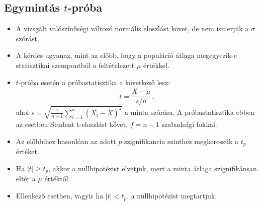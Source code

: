 \documentclass[12pt]{article}
\theoremstyle{plain}
\begin{document}
\subsection{Egymintás $t$-próba \cite{tprobawiki}}
\begin{itemize}
    \item A vizsgált valószínűségi változó normális eloszlást követ, de nem ismerjük a $\sigma$ szórást.
    \item A kérdés ugyanaz, mint az előbb, hogy a populáció átlaga megegyezik-e statisztikai szempontból a
    feltételezett $\mu$ értékkel.
    \item $t$-próba esetén a próbastatisztika a következő lesz:
        \begin{equation*}
            t = \frac{\overline{X}-\mu}{s/n} \,\text{,}
        \end{equation*}
        ahol ${\displaystyle s = \sqrt{\frac{1}{n-1}\sum\limits_{i=1}^{n}(X_i-\overline{X})^2}}$ a minta szórása. A próbastatisztika
        ebben az esetben Student t-eloszlást követ, $f=n-1$ szabadsági fokkal.
    \item Az előbbihez hasonlóan az adott $p$ szignifikancia szinthez megkeressük a $t_p$ értéket.
    \item Ha $|t| \geq t_p$, akkor a nullhipotézist elvetjük, mert a minta átlaga szignifikánsan eltér a $\mu$ értéktől.
    \item Ellenkező esetben, vagyis ha $|t| < t_p$, a nullhipotézist megtartjuk.
\end{itemize}
\end{document}
